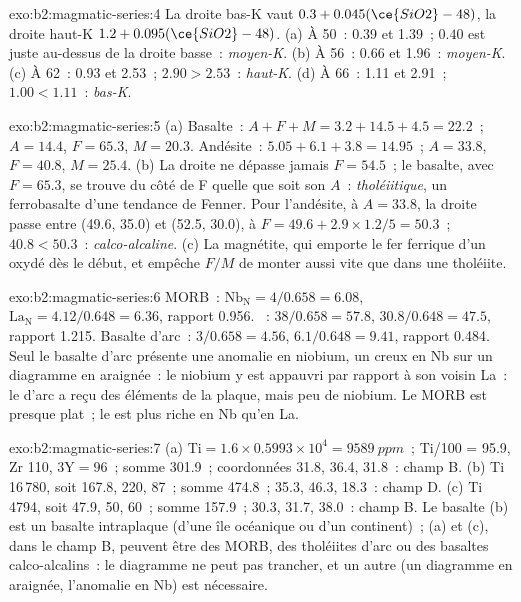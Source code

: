 \begin{solution}{exo:b2:magmatic-series:4}
La droite bas-K vaut $0.3 + 0.045(\ce{SiO2} - 48)$, la droite haut-K $1.2 +
0.095(\ce{SiO2} - 48)$. (a) À 50~: 0.39 et 1.39~; $0.40$ est juste au-dessus de la droite basse~:
\emph{moyen-K}. (b) À 56~: 0.66 et 1.96~: \emph{moyen-K}. (c) À 62~: 0.93 et 2.53~;
$2.90 > 2.53$~: \emph{haut-K}. (d) À 66~: 1.11 et 2.91~; $1.00 < 1.11$~: \emph{bas-K}.
\end{solution}

\begin{solution}{exo:b2:magmatic-series:5}
(a) Basalte~: $A + F + M = 3.2 + 14.5 + 4.5 = 22.2$~; $A = 14.4$, $F = 65.3$, $M = 20.3$.
Andésite~: $5.05 + 6.1 + 3.8 = 14.95$~; $A = 33.8$, $F = 40.8$, $M = 25.4$. (b) La droite
ne dépasse jamais $F = 54.5$~; le basalte, avec $F = 65.3$, se trouve du côté de F
quelle que soit son $A$~: \emph{tholéiitique}, un ferrobasalte d'une tendance de Fenner. Pour
l'andésite, à $A = 33.8$, la droite passe entre (49.6, 35.0) et (52.5, 30.0), à $F =
49.6 + 2.9\times1.2/5 = 50.3$~; $40.8 < 50.3$~: \emph{calco-alcaline}. (c) La magnétite,
qui emporte le fer ferrique d'un  oxydé dès le début,
et empêche $F/M$ de monter aussi vite que dans une tholéiite.
\end{solution}

\begin{solution}{exo:b2:magmatic-series:6}
MORB~: $\mathrm{Nb_N} = 4/0.658 = 6.08$, $\mathrm{La_N} = 4.12/0.648 = 6.36$, rapport
0.956. ~: $38/0.658 = 57.8$, $30.8/0.648 = 47.5$, rapport 1.215. Basalte d'arc~:
$3/0.658 = 4.56$, $6.1/0.648 = 9.41$, rapport 0.484. Seul le basalte d'arc présente une anomalie en
niobium, un creux en Nb sur un diagramme en araignée~: le niobium y est appauvri par rapport à son
voisin La~: le  d'arc a reçu des éléments de la plaque,
mais peu de niobium. Le MORB est presque
plat~; le  est plus riche en Nb qu'en La.
\end{solution}

\begin{solution}{exo:b2:magmatic-series:7}
(a) $\mathrm{Ti} = 1.6\times0.5993\times10^4 = \qty{9589}{ppm}$~; Ti/100 = 95.9, Zr
110, $3\mathrm Y = 96$~; somme 301.9~; coordonnées 31.8, 36.4, 31.8~: champ B. (b) Ti
16\,780, soit 167.8, 220, 87~; somme 474.8~; 35.3, 46.3, 18.3~: champ D. (c) Ti 4794, soit
47.9, 50, 60~; somme 157.9~; 30.3, 31.7, 38.0~: champ B. Le basalte (b) est un basalte intraplaque
(d'une île océanique ou d'un continent)~; (a) et (c), dans le champ B, peuvent être des MORB, des tholéiites
d'arc ou des basaltes calco-alcalins~: le diagramme ne peut pas trancher, et un autre (un diagramme
en araignée, l'anomalie en Nb) est nécessaire.
\end{solution}

